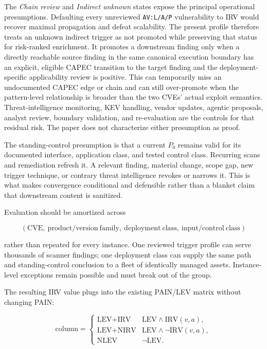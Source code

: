 \documentclass[11pt]{article}
\newcommand{\code}[1]{\texttt{#1}}
\begin{document}
The \emph{Chain review} and \emph{Indirect unknown} states expose the principal
operational presumptions. Defaulting every unreviewed \code{AV:L/A/P}
vulnerability to IRV would recover maximal propagation and defeat scalability.
The present profile therefore treats an unknown indirect trigger as not
promoted while preserving that status for risk-ranked enrichment. It promotes
a downstream finding only when a directly reachable source finding in the same
canonical execution boundary has an explicit, eligible CAPEC transition to the
target finding and the deployment-specific applicability review is positive.
This can temporarily miss an undocumented CAPEC edge or chain and can still
over-promote when the pattern-level relationship is broader than the two CVEs'
actual exploit semantics. Threat-intelligence
monitoring, KEV handling, vendor updates, agentic proposals, analyst review,
boundary validation, and re-evaluation are the controls for that residual
risk. The paper does not characterize either presumption as proof.

The standing-control presumption is that a current $P_0$ remains valid for
its documented interface, application class, and tested control class.
Recurring scans and remediation refresh it. A relevant finding, material
change, scope gap, new trigger technique, or contrary threat intelligence
revokes or narrows it. This is what makes convergence conditional and
defensible rather than a blanket claim that downstream content is sanitized.

Evaluation should be amortized across

\[
(\mathrm{CVE},\ \mathrm{product/version\ family},\
\mathrm{deployment\ class},\ \mathrm{input/control\ class})
\]

rather than repeated for every instance. One reviewed trigger profile can
serve thousands of scanner findings; one deployment class can supply the
same path and standing-control conclusion to a fleet of identically managed
assets. Instance-level exceptions remain possible and must break out of the
group.

The resulting IRV value plugs into the existing PAIN/LEV matrix without
changing PAIN:

\[
\text{column}=
\begin{cases}
\text{LEV+IRV} & \text{LEV}\wedge\mathrm{IRV}(v,a),\\
\text{LEV+NIRV} & \text{LEV}\wedge\neg\mathrm{IRV}(v,a),\\
\text{NLEV} & \neg\text{LEV}.
\end{cases}
\]
\end{document}
